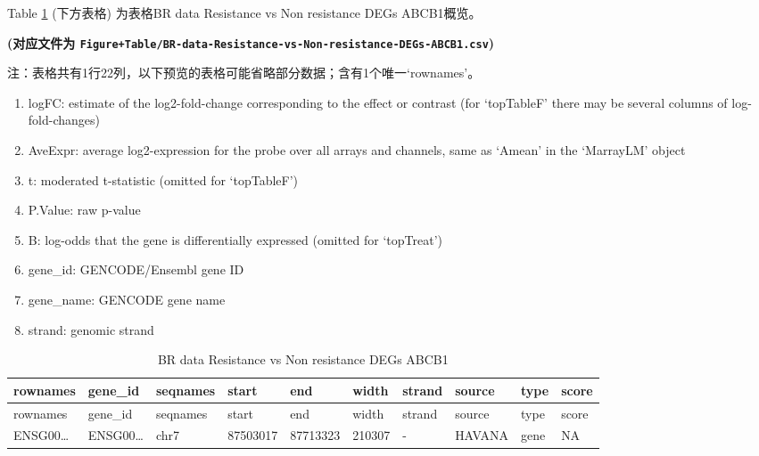 \documentclass[
]{article}
\providecommand{\tightlist}{%
  \setlength{\itemsep}{0pt}\setlength{\parskip}{0pt}}
\begin{document}
\begin{center}\vspace{1.5cm}\end{center}

Table \ref{tab:BR-data-Resistance-vs-Non-resistance-DEGs-ABCB1} (下方表格) 为表格BR data Resistance vs Non resistance DEGs ABCB1概览。

\textbf{(对应文件为 \texttt{Figure+Table/BR-data-Resistance-vs-Non-resistance-DEGs-ABCB1.csv})}

\begin{center}\begin{tcolorbox}[colback=gray!10, colframe=gray!50, width=0.9\linewidth, arc=1mm, boxrule=0.5pt]注：表格共有1行22列，以下预览的表格可能省略部分数据；含有1个唯一`rownames'。
\end{tcolorbox}
\end{center}
\begin{center}\begin{tcolorbox}[colback=gray!10, colframe=gray!50, width=0.9\linewidth, arc=1mm, boxrule=0.5pt]\begin{enumerate}\tightlist
\item logFC:  estimate of the log2-fold-change corresponding to the effect or contrast (for ‘topTableF’ there may be several columns of log-fold-changes)
\item AveExpr:  average log2-expression for the probe over all arrays and channels, same as ‘Amean’ in the ‘MarrayLM’ object
\item t:  moderated t-statistic (omitted for ‘topTableF’)
\item P.Value:  raw p-value
\item B:  log-odds that the gene is differentially expressed (omitted for ‘topTreat’)
\item gene\_id:  GENCODE/Ensembl gene ID
\item gene\_name:  GENCODE gene name
\item strand:  genomic strand
\end{enumerate}\end{tcolorbox}
\end{center}

\begin{longtable}[]{@{}llllllllll@{}}
\caption{\label{tab:BR-data-Resistance-vs-Non-resistance-DEGs-ABCB1}BR data Resistance vs Non resistance DEGs ABCB1}\tabularnewline
\toprule
rownames & gene\_id & seqnames & start & end & width & strand & source & type & score\tabularnewline
\midrule
\endfirsthead
\toprule
rownames & gene\_id & seqnames & start & end & width & strand & source & type & score\tabularnewline
\midrule
\endhead
ENSG00\ldots{} & ENSG00\ldots{} & chr7 & 87503017 & 87713323 & 210307 & - & HAVANA & gene & NA\tabularnewline
\bottomrule
\end{longtable}
\end{document}
